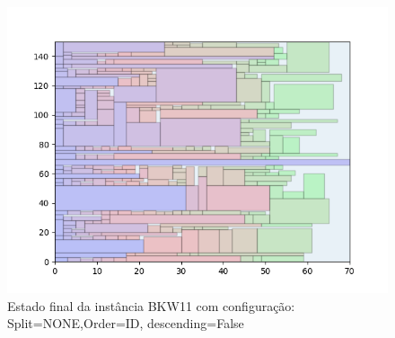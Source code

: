 \begin{figure}[H]
    \centering
    \caption[]{Estado final da instância BKW11 com configuração: Split=NONE,Order=ID, descending=False}
    \label{fig:bkw11-none-id-false}
    \includegraphics[scale=0.5]{output/figures/bkw/bkw11/none/id/false/000}
\end{figure}